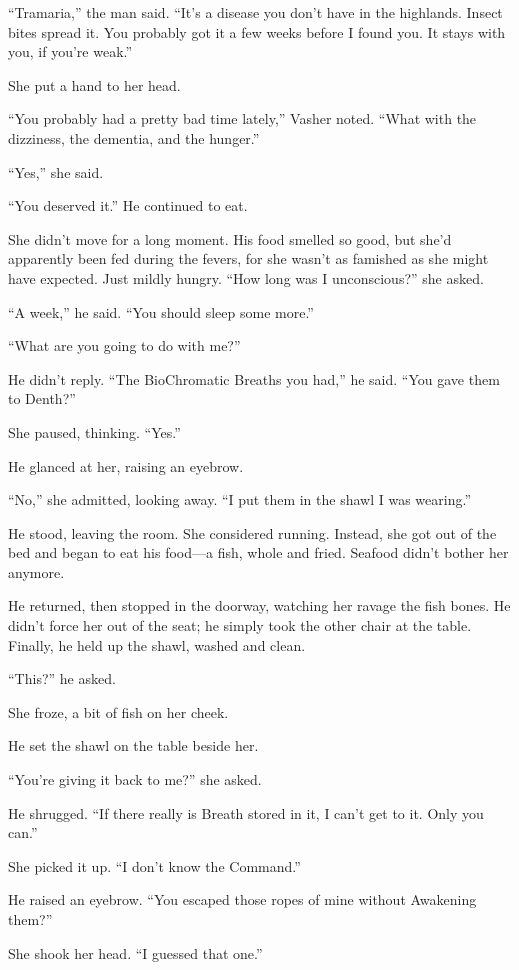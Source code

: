 “Tramaria,” the man said. “It’s a disease you don’t have in the highlands. Insect bites spread it. You probably got it a few weeks before I found you. It stays with you, if you’re weak.”

She put a hand to her head.

“You probably had a pretty bad time lately,” Vasher noted. “What with the dizziness, the dementia, and the hunger.”

“Yes,” she said.

“You deserved it.” He continued to eat.

She didn’t move for a long moment. His food smelled so good, but she’d apparently been fed during the fevers, for she wasn’t as famished as she might have expected. Just mildly hungry. “How long was I unconscious?” she asked.

“A week,” he said. “You should sleep some more.”

“What are you going to do with me?”

He didn’t reply. “The BioChromatic Breaths you had,” he said. “You gave them to Denth?”

She paused, thinking. “Yes.”

He glanced at her, raising an eyebrow.

“No,” she admitted, looking away. “I put them in the shawl I was wearing.”

He stood, leaving the room. She considered running. Instead, she got out of the bed and began to eat his food—a fish, whole and fried. Seafood didn’t bother her anymore.

He returned, then stopped in the doorway, watching her ravage the fish bones. He didn’t force her out of the seat; he simply took the other chair at the table. Finally, he held up the shawl, washed and clean.

“This?” he asked.

She froze, a bit of fish on her cheek.

He set the shawl on the table beside her.

“You’re giving it back to me?” she asked.

He shrugged. “If there really is Breath stored in it, I can’t get to it. Only you can.”

She picked it up. “I don’t know the Command.”

He raised an eyebrow. “You escaped those ropes of mine without Awakening them?”

She shook her head. “I guessed that one.”

